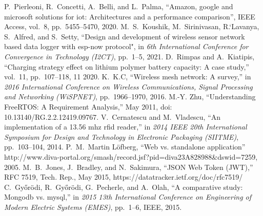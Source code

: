 \documentclass[journal]{IEEEtran}
\begin{document}
\begin{thebibliography}{1}
P.~Pierleoni, R.~Concetti, A.~Belli, and L.~Palma, ``Amazon, google and
microsoft solutions for iot: Architectures and a performance comparison'', IEEE Access, vol.~8, pp.~5455--5470, 2020.
M.~S.~Koushik, M.~Sirinivasan, R.`Lavanya, S.~Alfred, and S.~Setty, ``Design and development of wireless sensor network based data logger with esp-now protocol", in {\em 6th International Conference for Convergence in Technology (I2CT)}, pp.~1--5, 2021.
D.~Rimpas and A.~Kiatipis, ``Charging strategy effect on lithium polymer battery capacity: A case study,'' vol.~11, pp.~107--118, 11 2020.
K.~K.C, ``Wireless mesh network: A survey,'' in {\em 2016 International
Conference on Wireless Communications, Signal Processing and Networking (WiSPNET)}, pp.~1966--1970, 2016.
M.-Y. Zhu, “Understanding FreeRTOS: A Requirement Analysis,” May 2011, doi: 10.13140/RG.2.2.12419.09767.
V.~Cernatescu and M.~Vladescu, ``An implementation of a 13.56 mhz rfid
reader,'' in {\em 2014 IEEE 20th International Symposium for Design and
Technology in Electronic Packaging (SIITME)}, pp.~103--104, 2014.
P.~M.~Martin Löfberg, ``Web vs. standalone application'' http://www.diva-portal.org/smash/record.jsf?pid=diva23A828988\&dswid=7259, 2005.
M.~B.~Jones, J.~Bradley, and N.~Sakimura, “JSON Web Token (JWT),” RFC 7519, Tech. Rep., May 2015, https://datatracker.ietf.org/doc/rfc7519/
C.~Gy{\H{o}}r{\"o}di, R.~Gy{\H{o}}r{\"o}di, G.~Pecherle, and A.~Olah, ``A comparative study: Mongodb vs. mysql,'' in {\em 2015 13th International Conference on Engineering of Modern Electric Systems (EMES)}, pp.~1--6, IEEE, 2015.
\end{thebibliography}
\end{document}
